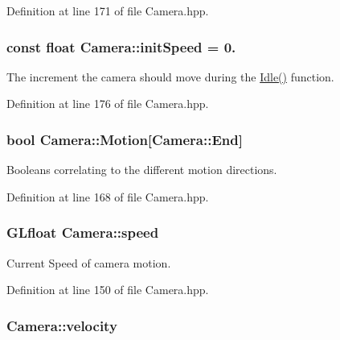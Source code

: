 Definition at line 171 of file Camera.\-hpp.

\hypertarget{class_camera_adc88510e14cf2f6d4c3f6b23216211dc}{
\subsubsection[{init\-Speed}]{\setlength{\rightskip}{0pt plus 5cm}const float Camera\-::init\-Speed = 0.\hspace{0.3cm}{\ttfamily [static]}}}\label{class_camera_adc88510e14cf2f6d4c3f6b23216211dc}


The increment the camera should move during the \hyperlink{class_camera_aec3559fe43597656629fdb00157d3c73}{Idle()} function. 



Definition at line 176 of file Camera.\-hpp.

\hypertarget{class_camera_a39746b4fadf30bba6bdc8aa6acfdc6f2}{
\subsubsection[{Motion}]{\setlength{\rightskip}{0pt plus 5cm}bool Camera\-::\-Motion\mbox{[}Camera\-::\-End\mbox{]}\hspace{0.3cm}{\ttfamily [private]}}}\label{class_camera_a39746b4fadf30bba6bdc8aa6acfdc6f2}


Booleans correlating to the different motion directions. 



Definition at line 168 of file Camera.\-hpp.

\hypertarget{class_camera_a308e92b5d3ef0eea5cac7745df6e28f4}{
\subsubsection[{speed}]{\setlength{\rightskip}{0pt plus 5cm}G\-Lfloat Camera\-::speed\hspace{0.3cm}{\ttfamily [private]}}}\label{class_camera_a308e92b5d3ef0eea5cac7745df6e28f4}


Current Speed of camera motion. 



Definition at line 150 of file Camera.\-hpp.

\hypertarget{class_camera_a5b95c890f213db50f321380108b17ea1}{
\subsubsection[{velocity}]{ Camera\-::velocity\hspace{0.3cm}{\ttfamily [private]}}}\label{class_camera_a5b95c890f213db50f321380108b17ea1}


